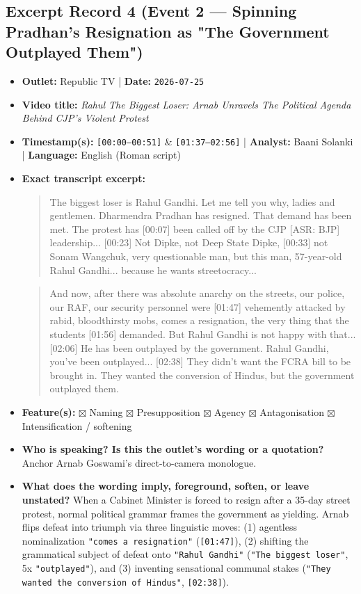 \documentclass[10pt,a4paper]{article}
\begin{document}
\subsection*{Excerpt Record 4 (Event 2 --- Spinning Pradhan's Resignation as "The Government Outplayed Them")}
\begin{itemize}[leftmargin=1.5em, itemsep=3pt, topsep=4pt]
  \item \textbf{Outlet:} Republic TV | \textbf{Date:} \texttt{2026-07-25}
  \item \textbf{Video title:} \textit{Rahul The Biggest Loser: Arnab Unravels The Political Agenda Behind CJP's Violent Protest}
  \item \textbf{Timestamp(s):} \texttt{[00:00--00:51]} \& \texttt{[01:37--02:56]} | \textbf{Analyst:} Baani Solanki | \textbf{Language:} English (Roman script)
  \item \textbf{Exact transcript excerpt:}
    \begin{quote}\small\ttfamily [00:00] The biggest loser is Rahul Gandhi. Let me tell you why, ladies and gentlemen. Dharmendra Pradhan has resigned. That demand has been met. The protest has [00:07] been called off by the CJP [ASR: BJP] leadership... [00:23] Not Dipke, not Deep State Dipke, [00:33] not Sonam Wangchuk, very questionable man, but this man, 57-year-old Rahul Gandhi... because he wants streetocracy...\end{quote}
    \begin{quote}\small\ttfamily [01:37] And now, after there was absolute anarchy on the streets, our police, our RAF, our security personnel were [01:47] vehemently attacked by rabid, bloodthirsty mobs, comes a resignation, the very thing that the students [01:56] demanded. But Rahul Gandhi is not happy with that... [02:06] He has been outplayed by the government. Rahul Gandhi, you've been outplayed... [02:38] They didn't want the FCRA bill to be brought in. They wanted the conversion of Hindus, but the government outplayed them.\end{quote}
  \item \textbf{Feature(s):} $\boxtimes$ Naming $\boxtimes$ Presupposition $\boxtimes$ Agency $\boxtimes$ Antagonisation $\boxtimes$ Intensification / softening
  \item \textbf{Who is speaking? Is this the outlet's wording or a quotation?} Anchor Arnab Goswami's direct-to-camera monologue.
  \item \textbf{What does the wording imply, foreground, soften, or leave unstated?} When a Cabinet Minister is forced to resign after a 35-day street protest, normal political grammar frames the government as yielding. Arnab flips defeat into triumph via three linguistic moves: (1) agentless nominalization \texttt{"comes a resignation"} (\texttt{[01:47]}), (2) shifting the grammatical subject of defeat onto \texttt{"Rahul Gandhi"} (\texttt{"The biggest loser"}, 5x \texttt{"outplayed"}), and (3) inventing sensational communal stakes (\texttt{"They wanted the conversion of Hindus"}, \texttt{[02:38]}).

\end{itemize}
\end{document}
